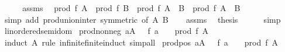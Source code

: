 \begin{isabellebody}
%
\isadelimproof
%
\endisadelimproof
%
\isatagproof
{}\isamarkupfalse%
\ {\isacharminus}{\kern0pt}\isanewline
\ \ \isamarkupfalse%
\ assms\ \isamarkupfalse%
\ {\isachardoublequoteopen}prod\ f\ A\ {\isacharasterisk}{\kern0pt}\ prod\ f\ B\ {\isacharequal}{\kern0pt}\ prod\ f\ {\isacharparenleft}{\kern0pt}A\ {\isasymunion}\ B{\isacharparenright}{\kern0pt}\ {\isacharasterisk}{\kern0pt}\ prod\ f\ {\isacharparenleft}{\kern0pt}A\ {\isasyminter}\ B{\isacharparenright}{\kern0pt}{\isachardoublequoteclose}\isanewline
\ \ \ \ \isamarkupfalse%
\ {\isacharparenleft}{\kern0pt}simp\ add{\isacharcolon}{\kern0pt}\ prod{\isachardot}{\kern0pt}union{\isacharunderscore}{\kern0pt}inter\ {\isacharbrackleft}{\kern0pt}symmetric{\isacharcomma}{\kern0pt}\ of\ A\ B{\isacharbrackright}{\kern0pt}{\isacharparenright}{\kern0pt}\isanewline
\ \ \isamarkupfalse%
\ assms\ \isamarkupfalse%
\ {\isacharquery}{\kern0pt}thesis\isanewline
\ \ \ \ \isamarkupfalse%
\ simp\isanewline
{}\isamarkupfalse%
%
\endisatagproof
{\isafoldproof}%
%
\isadelimproof
\isanewline
%
\endisadelimproof
\isanewline
{}\isamarkupfalse%
\ linordered{\isacharunderscore}{\kern0pt}semidom\isanewline
{}\isanewline
\isanewline
{}\isamarkupfalse%
\ prod{\isacharunderscore}{\kern0pt}nonneg{\isacharcolon}{\kern0pt}\ {\isachardoublequoteopen}{\isacharparenleft}{\kern0pt}{\isasymforall}a{\isasymin}A{\isachardot}{\kern0pt}\ {}\ {\isasymle}\ f\ a{\isacharparenright}{\kern0pt}\ {\isasymLongrightarrow}\ {}\ {\isasymle}\ prod\ f\ A{\isachardoublequoteclose}\isanewline
%
\isadelimproof
\ \ %
\endisadelimproof
%
\isatagproof
{}\isamarkupfalse%
\ {\isacharparenleft}{\kern0pt}induct\ A\ rule{\isacharcolon}{\kern0pt}\ infinite{\isacharunderscore}{\kern0pt}finite{\isacharunderscore}{\kern0pt}induct{\isacharparenright}{\kern0pt}\ simp{\isacharunderscore}{\kern0pt}all%
\endisatagproof
{\isafoldproof}%
%
\isadelimproof
\isanewline
%
\endisadelimproof
\isanewline
{}\isamarkupfalse%
\ prod{\isacharunderscore}{\kern0pt}pos{\isacharcolon}{\kern0pt}\ {\isachardoublequoteopen}{\isacharparenleft}{\kern0pt}{\isasymforall}a{\isasymin}A{\isachardot}{\kern0pt}\ {}\ {\isacharless}{\kern0pt}\ f\ a{\isacharparenright}{\kern0pt}\ {\isasymLongrightarrow}\ {}\ {\isacharless}{\kern0pt}\ prod\ f\ A{\isachardoublequoteclose}\isanewline
%
\isadelimproof
\ \ %
\endisadelimproof
%
\isatagproof
{}\isamarkupfalse%

\end{isabellebody}
